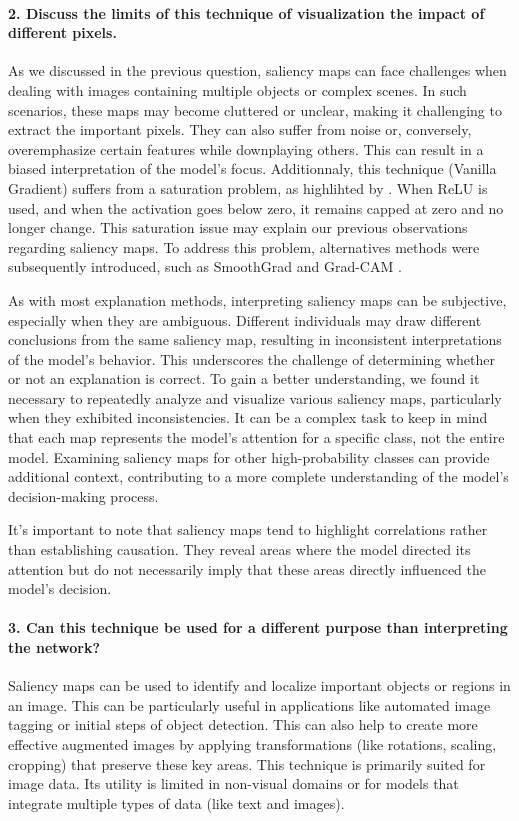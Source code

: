 
\paragraph*{2. Discuss the limits of this technique of visualization the impact of different pixels.}
As we discussed in the previous question, saliency maps can face challenges when dealing with images containing multiple objects or complex scenes. In such scenarios, these maps may become cluttered or unclear, making it challenging to extract the important pixels. They can also suffer from noise or, conversely, overemphasize certain features while downplaying others. This can result in a biased interpretation of the model's focus. Additionnaly, this technique (Vanilla Gradient) suffers from a saturation problem, as highlihted by \cite{shrikumar2019learning}. When ReLU is used, and when the activation goes below zero, it remains capped at zero and no longer change. This saturation issue may explain our previous observations regarding saliency maps. To address this problem, alternatives methods were subsequently introduced, such as SmoothGrad \citep{smilkov2017smoothgrad} and Grad-CAM \citep{Selvaraju_2019}.

As with most explanation methods, interpreting saliency maps can be subjective, especially when they are ambiguous. Different individuals may draw different conclusions from the same saliency map, resulting in inconsistent interpretations of the model's behavior. This underscores the challenge of determining whether or not an explanation is correct. To gain a better understanding, we found it necessary to repeatedly analyze and visualize various saliency maps, particularly when they exhibited inconsistencies. It can be a complex task to keep in mind that each map represents the model's attention for a specific class, not the entire model. Examining saliency maps for other high-probability classes can provide additional context, contributing to a more complete understanding of the model's decision-making process. 

It's important to note that saliency maps tend to highlight correlations rather than establishing causation. They reveal areas where the model directed its attention but do not necessarily imply that these areas directly influenced the model's decision.

\paragraph*{3. Can this technique be used for a different purpose than interpreting the network?}
Saliency maps can be used to identify and localize important objects or regions in an image. This can be particularly useful in applications like automated image tagging or initial steps of object detection. This can also  help to create more effective augmented images by applying transformations (like rotations, scaling, cropping) that preserve these key areas. This technique is primarily suited for image data. Its utility is limited in non-visual domains or for models that integrate multiple types of data (like text and images).

